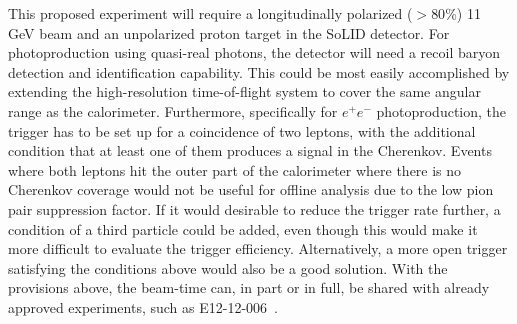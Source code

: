 This proposed experiment will require a longitudinally polarized ($>80$\%) 11
GeV beam and an unpolarized proton target in the SoLID detector.
For photoproduction using quasi-real photons, the detector will need a recoil
baryon detection and identification capability. This could be most easily
accomplished by extending the high-resolution time-of-flight system to cover
the same angular range as the calorimeter.
Furthermore, specifically for $e^+e^-$ photoproduction, the trigger has to be
set up for a coincidence of two leptons, with the additional condition that
at least one of them produces a signal in the Cherenkov. Events where both
leptons hit the outer part of the calorimeter where there is no Cherenkov
coverage would not be useful for offline analysis due to the low pion pair
suppression factor. If it would desirable to reduce the trigger rate further,
a condition of a third particle could be added, even though this would make
it more difficult to evaluate the trigger efficiency. Alternatively, a more
open trigger satisfying the conditions above would also be a good solution.
With the provisions above, the beam-time can, in part or in full, be shared
with already approved experiments, such as E12-12-006~\cite{E12-12-006}.

